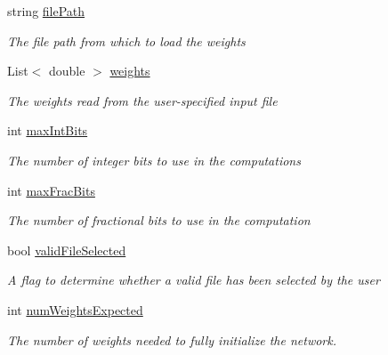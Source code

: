 \begin{DoxyCompactItemize}
\item 
string \hyperlink{class_n_n_gen_1_1_weights_and_precision_adadd8787371829217f9e9f11fe4f6043}{file\+Path}
\begin{DoxyCompactList}\small\item\em The file path from which to load the weights \end{DoxyCompactList}\item 
List$<$ double $>$ \hyperlink{class_n_n_gen_1_1_weights_and_precision_afe90c4fc998ce882228b7bf4459cf100}{weights}
\begin{DoxyCompactList}\small\item\em The weights read from the user-\/specified input file \end{DoxyCompactList}\item 
int \hyperlink{class_n_n_gen_1_1_weights_and_precision_a677dd8c72d4d4a7a2b18b292b1a9f6ee}{max\+Int\+Bits}
\begin{DoxyCompactList}\small\item\em The number of integer bits to use in the computations \end{DoxyCompactList}\item 
int \hyperlink{class_n_n_gen_1_1_weights_and_precision_a3ee82e53091eb1795bd64cb9b252b952}{max\+Frac\+Bits}
\begin{DoxyCompactList}\small\item\em The number of fractional bits to use in the computation \end{DoxyCompactList}\item 
bool \hyperlink{class_n_n_gen_1_1_weights_and_precision_a2dcb1b5045b95f5182ef8e8064931269}{valid\+File\+Selected}
\begin{DoxyCompactList}\small\item\em A flag to determine whether a valid file has been selected by the user \end{DoxyCompactList}\item 
int \hyperlink{class_n_n_gen_1_1_weights_and_precision_a670093e800483388eede4a81440dfb0c}{num\+Weights\+Expected}
\begin{DoxyCompactList}\small\item\em The number of weights needed to fully initialize the network. \end{DoxyCompactList}\end{DoxyCompactItemize}


